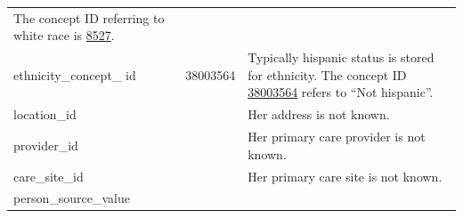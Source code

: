 \documentclass[11pt]{book}
\theoremstyle{definition}
\theoremstyle{definition}
\theoremstyle{definition}
\theoremstyle{remark}
\begin{document}
\begin{longtable}[]{@{}lll@{}}
\begin{minipage}[t]{0.49\columnwidth}
The concept ID referring to white race is \href{http://athena.ohdsi.org/search-terms/terms/8527}{8527}.\strut
\end{minipage}\tabularnewline
\begin{minipage}[t]{0.28\columnwidth}\raggedright
ethnicity\_concept\_ id\strut
\end{minipage} & \begin{minipage}[t]{0.15\columnwidth}\raggedright
38003564\strut
\end{minipage} & \begin{minipage}[t]{0.49\columnwidth}\raggedright
Typically hispanic status is stored for ethnicity. The concept ID \href{http://athena.ohdsi.org/search-terms/terms/38003564}{38003564} refers to ``Not hispanic''.\strut
\end{minipage}\tabularnewline
\begin{minipage}[t]{0.28\columnwidth}\raggedright
location\_id\strut
\end{minipage} & \begin{minipage}[t]{0.15\columnwidth}\raggedright
\strut
\end{minipage} & \begin{minipage}[t]{0.49\columnwidth}\raggedright
Her address is not known.\strut
\end{minipage}\tabularnewline
\begin{minipage}[t]{0.28\columnwidth}\raggedright
provider\_id\strut
\end{minipage} & \begin{minipage}[t]{0.15\columnwidth}\raggedright
\strut
\end{minipage} & \begin{minipage}[t]{0.49\columnwidth}\raggedright
Her primary care provider is not known.\strut
\end{minipage}\tabularnewline
\begin{minipage}[t]{0.28\columnwidth}\raggedright
care\_site\_id\strut
\end{minipage} & \begin{minipage}[t]{0.15\columnwidth}\raggedright
\strut
\end{minipage} & \begin{minipage}[t]{0.49\columnwidth}\raggedright
Her primary care site is not known.\strut
\end{minipage}\tabularnewline
\begin{minipage}[t]{0.28\columnwidth}\raggedright
person\_source\_value\strut
\end{minipage} & \begin{minipage}[t]{0.15\columnwidth}\raggedright

\end{minipage}
\end{longtable}
\end{document}

